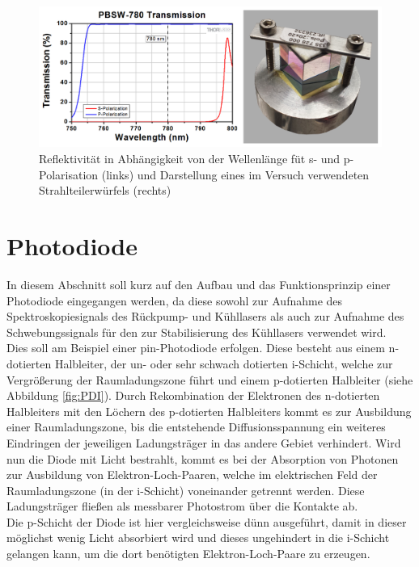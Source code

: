 \documentclass[
class=book,
accentcolor=1b,
custommargins=geometry,
fontsize=11pt,
thesis={type=Versuchsanleitung},
ruledheaders=all,
headline=false,
instbox=false,
marginpar=false,
title=small,
ignore-missing-data=true,
twoside=false,
logofile=apqdesign/tuda_logo.pdf,
pdfa=false %
]{apqpub}
\newtheorem{frage}[satz]{Frage}
\begin{document}
		\\
			
			\begin{figure}[htb!]
				\centering
				\includegraphics[width=\textwidth]{graphics/DP.jpg}
				\caption{Reflektivität in Abhängigkeit von der Wellenlänge füt s- und p-Polarisation (links) \cite{POL}
				und Darstellung eines im Versuch verwendeten Strahlteilerwürfels (rechts)}
				\label{fig:PST}
			\end{figure}

			\section{Photodiode}
			In diesem Abschnitt soll kurz auf den Aufbau und das Funktionsprinzip einer Photodiode eingegangen werden, da diese sowohl zur Aufnahme des Spektroskopiesignals des Rückpump- und Kühllasers als auch zur Aufnahme des Schwebungssignals für den  zur Stabilisierung des Kühllasers verwendet wird.\\
			Dies soll am Beispiel einer pin-Photodiode erfolgen. Diese besteht aus einem n-dotierten Halbleiter, der un- oder sehr schwach dotierten i-Schicht, welche zur Vergrößerung der Raumladungszone führt und einem p-dotierten Halbleiter (siehe Abbildung \ref{fig:PDI}). Durch Rekombination der Elektronen des n-dotierten Halbleiters mit den Löchern des p-dotierten Halbleiters kommt es zur Ausbildung einer Raumladungszone, bis die entstehende Diffusionsspannung ein weiteres Eindringen der jeweiligen Ladungsträger in das andere Gebiet verhindert. Wird nun die Diode mit Licht bestrahlt, kommt es bei der Absorption von Photonen zur Ausbildung von Elektron-Loch-Paaren, welche im elektrischen Feld der Raumladungszone (in der i-Schicht) voneinander getrennt werden. Diese Ladungsträger fließen als messbarer Photostrom über die Kontakte ab.\\
			Die p-Schicht der Diode ist hier vergleichsweise dünn ausgeführt, damit in dieser möglichst wenig Licht absorbiert wird und dieses ungehindert in die i-Schicht gelangen kann, um die dort benötigten Elektron-Loch-Paare zu erzeugen.
			
\end{document}
